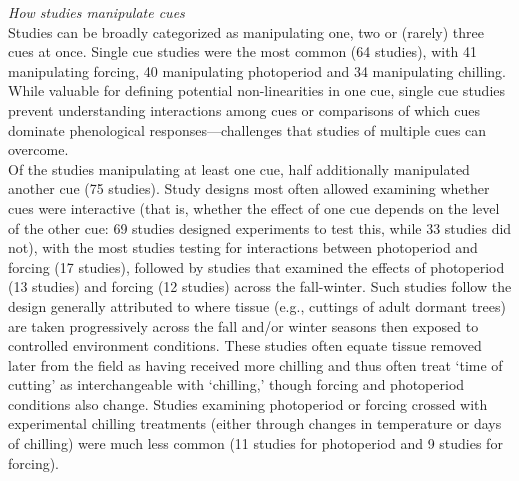 \documentclass[11pt,letter]{article}
\begin{document}


\emph{How studies manipulate cues}\\
Studies can be broadly categorized as manipulating one, two or (rarely) three cues at once. Single cue studies were the most common (64 studies), with 41 manipulating forcing, 40 manipulating photoperiod and  34 manipulating chilling. While valuable for defining potential non-linearities in one cue, single cue studies prevent understanding interactions among cues or comparisons of which cues dominate phenological responses---challenges that studies of multiple cues can overcome. \\

Of the studies manipulating at least one cue, half additionally manipulated another cue (75 studies). Study designs most often allowed examining whether cues were interactive (that is, whether the effect of one cue depends on the level of the other cue: 69 studies designed experiments to test this, while 33 studies did not), with the most studies testing for interactions between photoperiod and forcing (17  studies), followed by studies that examined the effects of photoperiod (13 studies) and forcing (12 studies) across the fall-winter. Such studies follow the design generally attributed to \citet{weinberger1950} where tissue (e.g., cuttings of adult dormant trees) are taken progressively across the fall and/or winter seasons then exposed to controlled environment conditions. These studies often equate tissue removed later from the field as having received more chilling and thus often treat `time of cutting' as interchangeable with `chilling,' though forcing and photoperiod conditions also change. Studies examining photoperiod or forcing crossed with experimental chilling treatments (either through changes in temperature or days of chilling) were much less common (11 studies for photoperiod and 9 studies for forcing). \\
\end{document}
